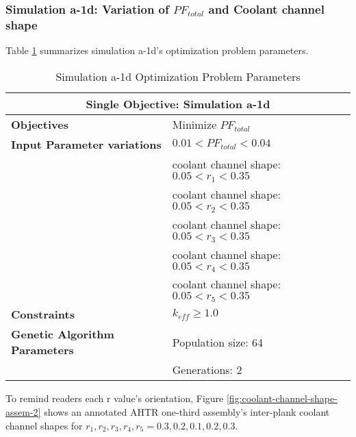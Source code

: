 \subsubsection{Simulation a-1d: Variation of $PF_{total}$ and Coolant channel shape}
Table \ref{tab:simulationa1d} summarizes simulation a-1d's optimization problem parameters. 
\begin{table}[htbp!]
    \centering
    \onehalfspacing
    \caption{Simulation a-1d Optimization Problem Parameters}
	\label{tab:simulationa1d}
    \footnotesize
    \begin{tabular}{l|p{6cm}}
    \hline 
    \multicolumn{2}{c}{\textbf{Single Objective: Simulation a-1d}} \\
    \hline 
    \textbf{Objectives} & Minimize $PF_{total}$ \\
    \hline 
    \textbf{Input Parameter variations} & $0.01<PF_{total}<0.04$ \\
    & coolant channel shape: $0.05<r_{1}<0.35$ \\
    & coolant channel shape: $0.05<r_{2}<0.35$ \\
    & coolant channel shape: $0.05<r_{3}<0.35$ \\
    & coolant channel shape: $0.05<r_{4}<0.35$ \\
    & coolant channel shape: $0.05<r_{5}<0.35$ \\
    \hline
    \textbf{Constraints} & $k_{eff} \geq 1.0$\\ 
    \hline 
    \textbf{Genetic Algorithm Parameters} & Population size: 64 \\
    & Generations: 2 \\
    \hline
    \end{tabular}
\end{table}
To remind readers each r value's orientation, Figure 
\ref{fig:coolant-channel-shape-assem-2} shows an annotated \gls{AHTR} one-third 
assembly's inter-plank coolant channel shapes for 
$r_1, r_2, r_3, r_4, r_5 = 0.3, 0.2, 0.1, 0.2, 0.3$.
